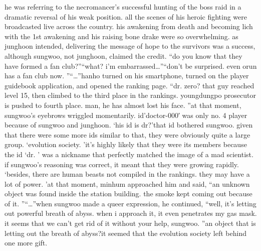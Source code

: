 he was referring to the necromancer’s successful hunting of the boss raid in a dramatic reversal of his weak position.
all the scenes of his heroic fighting were broadcasted live across the country.
his awakening from death and becoming lich with the 1st awakening and his raising bone drake were so overwhelming.
as junghoon intended, delivering the message of hope to the survivors was a success, although sungwoo, not junghoon, claimed the credit.
“do you know that they have formed a fan club?”“what? i’m embarrassed…”“don’t be surprised.
 even orun has a fan club now.
”“…”hanho turned on his smartphone, turned on the player guidebook application, and opened the ranking page.
“dr.
 zero? that guy reached level 15, then climbed to the third place in the rankings.
 youngdungpo prosecutor is pushed to fourth place.
 man, he has almost lost his face.
”at that moment, sungwoo’s eyebrows wriggled momentarily.
 id’doctor-000′ was only no.
 4 player because of sungwoo and junghoon.
‘his id is dr?’that id bothered sungwoo.
 given that there were some more ids similar to that, they were obviously quite a large group.
‘evolution society.
’it’s highly likely that they were its members because the id ‘dr.
’ was a nickname that perfectly matched the image of a mad scientist.
 if sungwoo’s reasoning was correct, it meant that they were growing rapidly.
‘besides, there are human beasts not compiled in the rankings.
 they may have a lot of power.
’at that moment, minhum approached him and said, “an unknown object was found inside the station building.
 the smoke kept coming out because of it.
”“…”when sungwoo made a queer expression, he continued, “well, it’s letting out powerful breath of abyss.
 when i approach it, it even penetrates my gas mask.
 it seems that we can’t get rid of it without your help, sungwoo.
”an object that is letting out the breath of abyss?it seemed that the evolution society left behind one more gift.


 